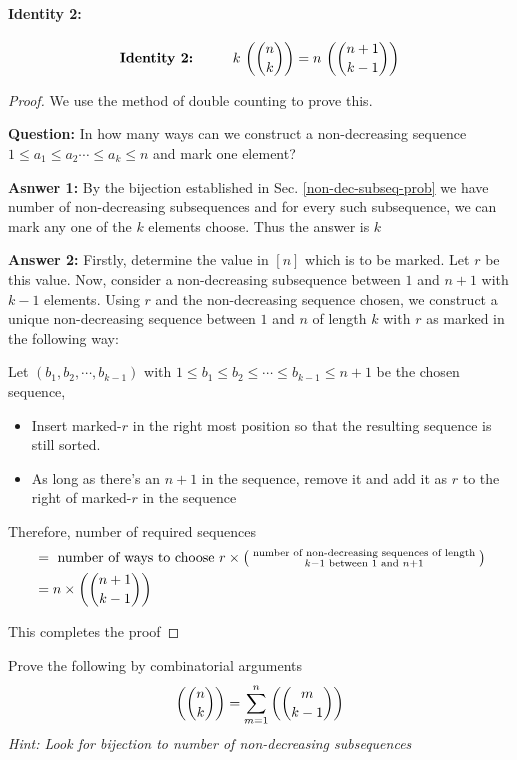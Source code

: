 \paragraph{Identity 2:}
$$\textrm{\bf Identity 2:\hspace{1cm}} k~\textrm{$\left(\binom{n}{k}\right)$}=n~\textrm{$\left(\binom{n+1}{k-1}\right)$}$$
\begin{proof}
We use the method of double counting to prove this.
\begin{description}
\item \textbf{Question:} In how many ways can we construct a non-decreasing sequence $1\leq a_1\leq a_2\cdots\leq a_k\leq n$ and mark one element?
\item \textbf{Asnwer 1:} By the bijection established in Sec. \ref{non-dec-subseq-prob} we have  number of non-decreasing subsequences and for every such subsequence, we can mark any one of the $k$ elements choose. Thus the answer is $k$  
\item \textbf{Answer 2:} Firstly, determine the value in $[n]$ which is to be marked. Let $r$ be this value. Now, consider a non-decreasing subsequence between $1$ and $n+1$ with $k-1$ elements. Using $r$ and the non-decreasing sequence chosen, we construct a unique non-decreasing sequence between $1$ and $n$ of length $k$ with $r$ as marked in the following way:

Let $(b_1,b_2,\cdots,b_{k-1})$ with $1\leq b_1\leq b_2\leq\cdots\leq b_{k-1}\leq n+1$ be the chosen sequence, 
\begin{itemize}
    \item Insert marked-$r$ in the right most position so that the resulting sequence is still sorted.
    \item As long as there's an $n+1$ in the sequence, remove it and add it as $r$ to the right of marked-$r$ in the sequence
\end{itemize}
Therefore, number of required sequences 
\begin{align*}
    &= \textrm{ number of ways to choose }r \times \left( \substack{\textrm{ number of non-decreasing sequences of length }\\ k-1 \textrm{ between } 1 \textrm{ and } n+1} \right) \\
    &= n\times \textrm{$\left(\binom{n+1}{k-1}\right)$}
\end{align*}
\end{description}
This completes the proof
\end{proof}

\begin{exercise}
Prove the following by combinatorial arguments $$\textrm{$\left(\binom{n}{k}\right)$}=\sum\limits_{m=1}^{n}\textrm{$\left(\binom{m}{k-1}\right)$}$$ {\em Hint: Look for bijection to number of non-decreasing subsequences}
\end{exercise}

